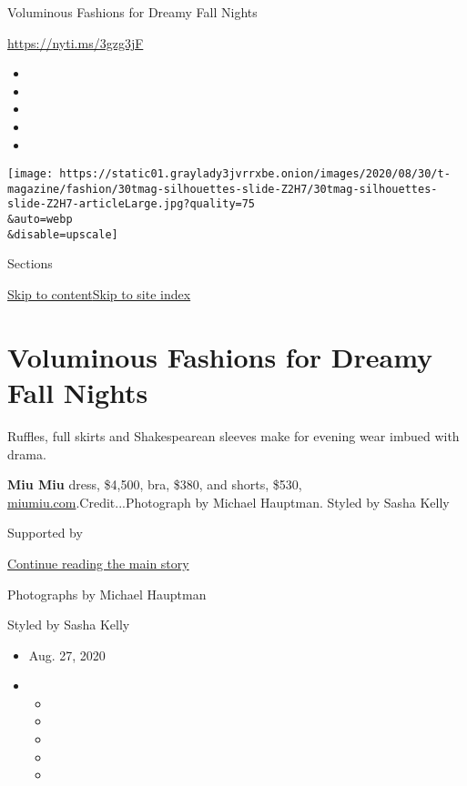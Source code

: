 Voluminous Fashions for Dreamy Fall Nights

\url{https://nyti.ms/3gzg3jF}

\begin{itemize}
\item
\item
\item
\item
\item
\end{itemize}

\texttt{[image: https://static01.graylady3jvrrxbe.onion/images/2020/08/30/t-magazine/fashion/30tmag-silhouettes-slide-Z2H7/30tmag-silhouettes-slide-Z2H7-articleLarge.jpg?quality=75\\\&auto=webp\\\&disable=upscale]}

Sections

\protect\hyperlink{site-content}{Skip to
content}\protect\hyperlink{site-index}{Skip to site index}

\hypertarget{voluminous-fashions-for-dreamy-fall-nights}{%
\section{Voluminous Fashions for Dreamy Fall
Nights}\label{voluminous-fashions-for-dreamy-fall-nights}}

Ruffles, full skirts and Shakespearean sleeves make for evening wear
imbued with drama.

\textbf{Miu Miu} dress, \$4,500, bra, \$380, and shorts, \$530,
\href{https://www.miumiu.com/us/en.html}{miumiu.com}.Credit...Photograph
by Michael Hauptman. Styled by Sasha Kelly

Supported by

\protect\hyperlink{after-sponsor}{Continue reading the main story}

Photographs by Michael Hauptman

Styled by Sasha Kelly

\begin{itemize}
\item
  Aug. 27, 2020
\item
  \begin{itemize}
  \item
  \item
  \item
  \item
  \item
  \end{itemize}
\end{itemize}

